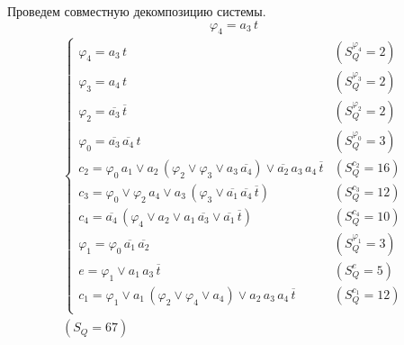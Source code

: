 \documentclass{article}
\begin{document}
\noindent\begin{minipage}{\textwidth}
Проведем совместную декомпозицию системы. \[\varphi_{4} = a_3\,t\]
\[\begin{matrix}
    \begin{cases}
        \varphi_{4} = a_3\,t & (S_Q^{\varphi_{4}} = 2) \\
        \varphi_{3} = a_4\,t & (S_Q^{\varphi_{3}} = 2) \\
        \varphi_{2} = \overline{a_3}\,\overline{t} & (S_Q^{\varphi_{2}} = 2) \\
        \varphi_{0} = \overline{a_3}\,\overline{a_4}\,t & (S_Q^{\varphi_{0}} = 3) \\
        c_2 = \varphi_{0}\,a_1 \lor a_2\,\left(\varphi_{2} \lor \varphi_{3} \lor a_3\,\overline{a_4}\right) \lor \overline{a_2}\,a_3\,a_4\,\overline{t} & (S_Q^{c_2} = 16) \\
        c_3 = \varphi_{0} \lor \varphi_{2}\,a_4 \lor a_3\,\left(\varphi_{3} \lor \overline{a_1}\,\overline{a_4}\,\overline{t}\right) & (S_Q^{c_3} = 12) \\
        c_4 = \overline{a_4}\,\left(\varphi_{4} \lor a_2 \lor a_1\,\overline{a_3} \lor \overline{a_1}\,\overline{t}\right) & (S_Q^{c_4} = 10) \\
        \varphi_{1} = \varphi_{0}\,\overline{a_1}\,\overline{a_2} & (S_Q^{\varphi_{1}} = 3) \\
        e = \varphi_{1} \lor a_1\,a_3\,\overline{t} & (S_Q^{e} = 5) \\
        c_1 = \varphi_{1} \lor a_1\,\left(\varphi_{2} \lor \varphi_{4} \lor a_4\right) \lor a_2\,a_3\,a_4\,\overline{t} & (S_Q^{c_1} = 12) \\
    \end{cases} \\ (S_Q = 67)
\end{matrix}\] \\ \phantom{0}
\end{minipage}
\end{document}
